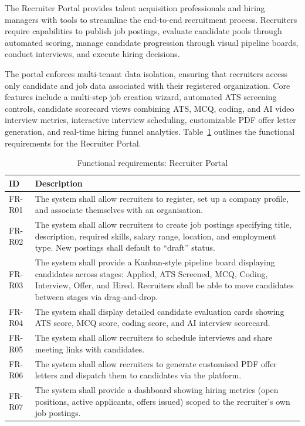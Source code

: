 The Recruiter Portal provides talent acquisition professionals and hiring managers with tools to streamline the end-to-end recruitment process. Recruiters require capabilities to publish job postings, evaluate candidate pools through automated scoring, manage candidate progression through visual pipeline boards, conduct interviews, and execute hiring decisions.

The portal enforces multi-tenant data isolation, ensuring that recruiters access only candidate and job data associated with their registered organization. Core features include a multi-step job creation wizard, automated ATS screening controls, candidate scorecard views combining ATS, MCQ, coding, and AI video interview metrics, interactive interview scheduling, customizable PDF offer letter generation, and real-time hiring funnel analytics. Table~\ref{tab:fr-recruiter} outlines the functional requirements for the Recruiter Portal.

\begin{table}[htbp]
\centering
\caption{Functional requirements: Recruiter Portal}
\label{tab:fr-recruiter}
\small
\begin{tabular}{p{0.8in}p{4.8in}}
\toprule
\textbf{ID} & \textbf{Description} \\
\midrule
FR-R01 & The system shall allow recruiters to register, set up a company profile, and associate themselves with an organisation. \\
FR-R02 & The system shall allow recruiters to create job postings specifying title, description, required skills, salary range, location, and employment type. New postings shall default to ``draft'' status. \\
FR-R03 & The system shall provide a Kanban-style pipeline board displaying candidates across stages: Applied, ATS Screened, MCQ, Coding, Interview, Offer, and Hired. Recruiters shall be able to move candidates between stages via drag-and-drop. \\
FR-R04 & The system shall display detailed candidate evaluation cards showing ATS score, MCQ score, coding score, and AI interview scorecard. \\
FR-R05 & The system shall allow recruiters to schedule interviews and share meeting links with candidates. \\
FR-R06 & The system shall allow recruiters to generate customised PDF offer letters and dispatch them to candidates via the platform. \\
FR-R07 & The system shall provide a dashboard showing hiring metrics (open positions, active applicants, offers issued) scoped to the recruiter's own job postings. \\
\bottomrule
\end{tabular}
\end{table}

